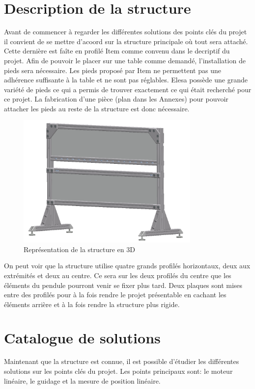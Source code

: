 \section{Description de la structure}\label{sec:DescStruct}
Avant de commencer à regarder les différentes solutions des points clés du projet il convient de se mettre d'acoord
sur la structure principale où tout sera attaché. Cette dernière est faîte en profilé Item \cite{Item} comme convenu dans le decriptif
du projet. Afin de pouvoir le placer sur une table comme demandé, l'installation de pieds sera nécessaire. Les pieds proposé par Item ne
permettent pas une adhérence suffisante à la table et ne sont pas réglables. Elesa \cite{Elesa} possède une grande variété de pieds ce qui
a permis de trouver exactement ce qui était recherché pour ce projet. La fabrication d'une pièce (plan dans les Annexes) pour pouvoir attacher
les pieds au reste de la structure est donc nécessaire.

\begin{figure}[H]
    \centering
    \includegraphics[width = 0.8\textwidth]{assets/figures/Structure.png}
    \caption{Représentation de la structure en 3D}
    \label{fig:DescStruct}
\end{figure}

On peut voir que la structure utilise quatre grands profilés horizontaux, deux aux extrémités et deux au centre. Ce sera sur les deux profilés du centre que
les éléments du pendule pourront venir se fixer plus tard. Deux plaques sont mises entre des profilés pour à la fois rendre le projet présentable
en cachant les éléments arrière et à la fois rendre la structure plus rigide.

\section{Catalogue de solutions}\label{sec:CatSol}
Maintenant que la structure est connue, il est possible d'étudier les différentes solutions sur les points clés du projet.
Les points principaux sont: le moteur linéaire, le guidage et la mesure de position linéaire.

